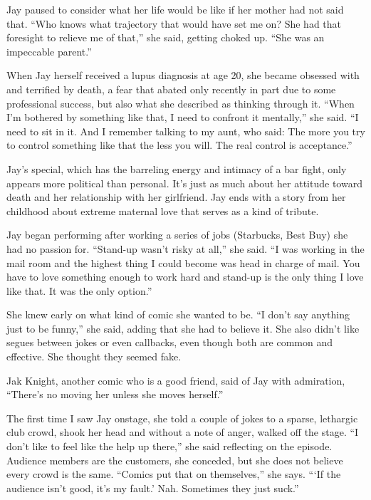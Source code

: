 Jay paused to consider what her life would be like if her mother had not
said that. ``Who knows what trajectory that would have set me on? She
had that foresight to relieve me of that,'' she said, getting choked up.
``She was an impeccable parent.''

When Jay herself received a lupus diagnosis at age 20, she became
obsessed with and terrified by death, a fear that abated only recently
in part due to some professional success, but also what she described as
thinking through it. ``When I'm bothered by something like that, I need
to confront it mentally,'' she said. ``I need to sit in it. And I
remember talking to my aunt, who said: The more you try to control
something like that the less you will. The real control is acceptance.''

Jay's special, which has the barreling energy and intimacy of a bar
fight, only appears more political than personal. It's just as much
about her attitude toward death and her relationship with her
girlfriend. Jay ends with a story from her childhood about extreme
maternal love that serves as a kind of tribute.

Jay began performing after working a series of jobs (Starbucks, Best
Buy) she had no passion for. ``Stand-up wasn't risky at all,'' she said.
``I was working in the mail room and the highest thing I could become
was head in charge of mail. You have to love something enough to work
hard and stand-up is the only thing I love like that. It was the only
option.''

She knew early on what kind of comic she wanted to be. ``I don't say
anything just to be funny,'' she said, adding that she had to believe
it. She also didn't like segues between jokes or even callbacks, even
though both are common and effective. She thought they seemed fake.

Jak Knight, another comic who is a good friend, said of Jay with
admiration, ``There's no moving her unless she moves herself.''

The first time I saw Jay onstage, she told a couple of jokes to a
sparse, lethargic club crowd, shook her head and without a note of
anger, walked off the stage. ``I don't like to feel like the help up
there,'' she said reflecting on the episode. Audience members are the
customers, she conceded, but she does not believe every crowd is the
same. ``Comics put that on themselves,'' she says. ```If the audience
isn't good, it's my fault.' Nah. Sometimes they just suck.''


